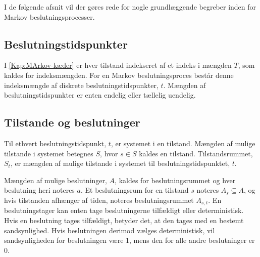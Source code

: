 


I de følgende afsnit vil der gøres rede for nogle grundlæggende begreber inden for Markov beslutningsprocesser.

\subsection{Beslutningstidspunkter}
I \autoref{Kap:MArkov-kæder} er hver tilstand indekseret af et indeks i mængden $T$, som kaldes for indeksmængden. For en Markov beslutningsproces består denne indeksmængde af diskrete beslutningstidspunkter, $t$. Mængden af beslutningstidspunkter er enten endelig eller tællelig uendelig. %


\subsection{Tilstande og beslutninger}
Til ethvert beslutningstidspunkt, $t$, er systemet i en tilstand. Mængden af mulige tilstande i systemet betegnes $S$, hvor $s\in S$ kaldes en tilstand. Tilstandsrummet, $S_t$, er mængden af mulige tilstande i systemet til beslutningstidspunktet, $t$. 

Mængden af mulige beslutninger, $A$, kaldes for beslutningsrummet og hver beslutning heri noteres $a$. Et beslutningsrum for en tilstand $s$ noteres $A_s\subseteq A$, og hvis tilstanden afhænger af tiden, noteres beslutningsrummet $A_{s, t}$. En beslutningstager kan enten tage beslutningerne tilfældigt eller deterministisk. Hvis en beslutning tages tilfældigt, betyder det, at den tages med en bestemt sandsynlighed. Hvis beslutningen derimod vælges deterministisk, vil sandsynligheden for beslutningen være 1, mens den for alle andre beslutninger er 0.

